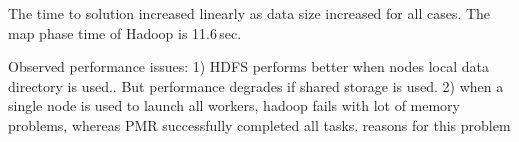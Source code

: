 \documentclass{acm_proc_article-sp}
\newcommand{\alnote}[1]{ {\textcolor{blue} { ***andreL: #1 }}}
\newcommand{\pnote}[1]{ {\textcolor{magenta} { ***pradeep: #1 }}}
\newcommand{\alnote}[1]{}
\newcommand{\pnote}[1]{}
\begin{document}
The time to solution increased linearly as data size increased for all cases. 
The map phase time of Hadoop is 11.6\,sec.






Observed performance issues:
1) HDFS performs better when nodes local data directory is used.. But performance degrades if shared storage is used. 			
2) when a single node is used to launch all workers, hadoop fails with lot of memory problems, whereas PMR successfully completed all tasks.			
reasons for this problem

\end{document}
